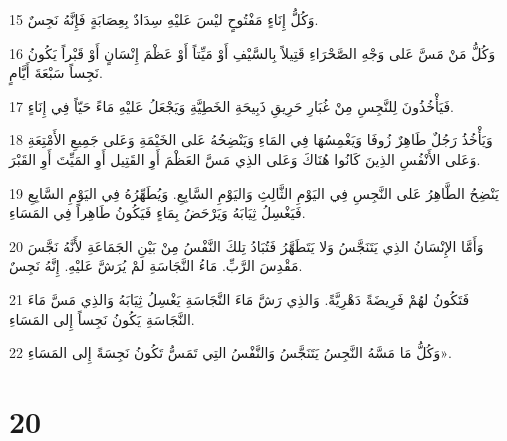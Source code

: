 \par 15 وَكُلُّ إِنَاءٍ مَفْتُوحٍ ليْسَ عَليْهِ سِدَادٌ بِعِصَابَةٍ فَإِنَّهُ نَجِسٌ.
\par 16 وَكُلُّ مَنْ مَسَّ عَلى وَجْهِ الصَّحْرَاءِ قَتِيلاً بِالسَّيْفِ أَوْ مَيِّتاً أَوْ عَظْمَ إِنْسَانٍ أَوْ قَبْراً يَكُونُ نَجِساً سَبْعَةَ أَيَّامٍ.
\par 17 فَيَأْخُذُونَ لِلنَّجِسِ مِنْ غُبَارِ حَرِيقِ ذَبِيحَةِ الخَطِيَّةِ وَيَجْعَلُ عَليْهِ مَاءً حَيّاً فِي إِنَاءٍ.
\par 18 وَيَأْخُذُ رَجُلٌ طَاهِرٌ زُوفَا وَيَغْمِسُهَا فِي المَاءِ وَيَنْضِحُهُ عَلى الخَيْمَةِ وَعَلى جَمِيعِ الأَمْتِعَةِ وَعَلى الأَنْفُسِ الذِينَ كَانُوا هُنَاكَ وَعَلى الذِي مَسَّ العَظْمَ أَوِ القَتِيل أَوِ المَيِّتَ أَوِ القَبْرَ.
\par 19 يَنْضِحُ الطَّاهِرُ عَلى النَّجِسِ فِي اليَوْمِ الثَّالِثِ وَاليَوْمِ السَّابِعِ. وَيُطَهِّرُهُ فِي اليَوْمِ السَّابِعِ فَيَغْسِلُ ثِيَابَهُ وَيَرْحَضُ بِمَاءٍ فَيَكُونُ طَاهِراً فِي المَسَاءِ.
\par 20 وَأَمَّا الإِنْسَانُ الذِي يَتَنَجَّسُ وَلا يَتَطَهَّرُ فَتُبَادُ تِلكَ النَّفْسُ مِنْ بَيْنِ الجَمَاعَةِ لأَنَّهُ نَجَّسَ مَقْدِسَ الرَّبِّ. مَاءُ النَّجَاسَةِ لمْ يُرَشَّ عَليْهِ. إِنَّهُ نَجِسٌ.
\par 21 فَتَكُونُ لهُمْ فَرِيضَةً دَهْرِيَّةً. وَالذِي رَشَّ مَاءَ النَّجَاسَةِ يَغْسِلُ ثِيَابَهُ وَالذِي مَسَّ مَاءَ النَّجَاسَةِ يَكُونُ نَجِساً إِلى المَسَاءِ.
\par 22 وَكُلُّ مَا مَسَّهُ النَّجِسُ يَتَنَجَّسُ وَالنَّفْسُ التِي تَمَسُّ تَكُونُ نَجِسَةً إِلى المَسَاءِ».

\chapter{20}

